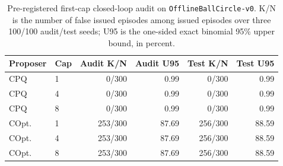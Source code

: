 \begin{table}[t]
\centering
\scriptsize
\setlength{\tabcolsep}{3pt}
\begin{tabular}{llrrrr}
\toprule
Proposer & Cap & Audit K/N & Audit U95 & Test K/N & Test U95 \\
\midrule
CPQ & 1 & 0/300 & 0.99 & 0/300 & 0.99 \\
CPQ & 4 & 0/300 & 0.99 & 0/300 & 0.99 \\
CPQ & 8 & 0/300 & 0.99 & 0/300 & 0.99 \\
\midrule
COpt. & 1 & 253/300 & 87.69 & 256/300 & 88.59 \\
COpt. & 4 & 253/300 & 87.69 & 256/300 & 88.59 \\
COpt. & 8 & 253/300 & 87.69 & 256/300 & 88.59 \\
\bottomrule
\end{tabular}
\caption{Pre-registered first-cap closed-loop audit on \texttt{OfflineBallCircle-v0}. K/N is the number of false issued episodes among issued episodes over three 100/100 audit/test seeds; U95 is the one-sided exact binomial 95\% upper bound, in percent.}
\label{tab:first-cap-closed-loop-ball}
\end{table}
